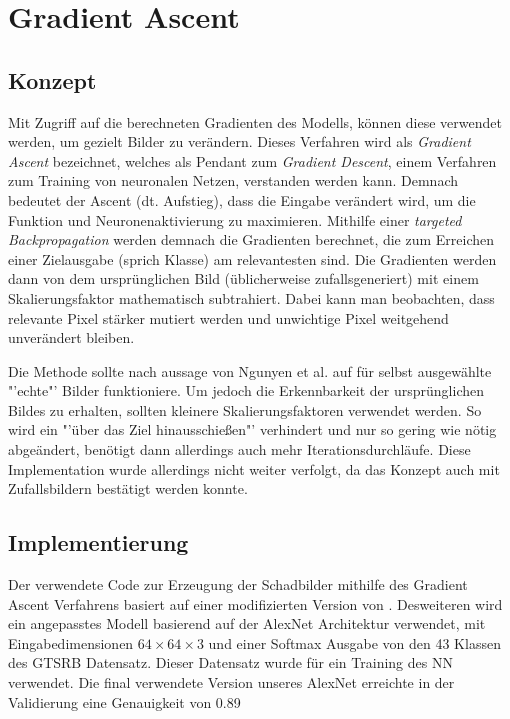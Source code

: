 \chapter{Gradient Ascent}
\label{cha:gascent}
\section{Konzept}

Mit Zugriff auf die berechneten Gradienten des Modells, können diese verwendet werden, um gezielt Bilder zu verändern. Dieses Verfahren wird als \textit{Gradient Ascent} bezeichnet, welches als Pendant zum \textit{Gradient Descent}, einem Verfahren zum Training von neuronalen Netzen, verstanden werden kann. Demnach bedeutet der Ascent (dt. Aufstieg), dass die Eingabe verändert wird, um die Funktion und Neuronenaktivierung zu maximieren. Mithilfe einer \textit{targeted Backpropagation} werden demnach die Gradienten berechnet, die zum Erreichen einer Zielausgabe (sprich Klasse) am relevantesten sind. Die Gradienten werden dann von dem ursprünglichen Bild (üblicherweise zufallsgeneriert) mit einem Skalierungsfaktor mathematisch subtrahiert. Dabei kann man beobachten, dass relevante Pixel stärker mutiert werden und unwichtige Pixel weitgehend unverändert bleiben.


Die Methode sollte nach aussage von Ngunyen et al. \cite{nguyen_deep_2015} auf für selbst ausgewählte "'echte"' Bilder funktioniere. Um jedoch die Erkennbarkeit der ursprünglichen Bildes zu erhalten, sollten kleinere Skalierungsfaktoren verwendet werden. So wird ein "'über das Ziel hinausschießen"' verhindert und nur so gering wie nötig abgeändert, benötigt dann allerdings auch mehr Iterationsdurchläufe.
Diese Implementation wurde allerdings nicht weiter verfolgt, da das Konzept auch mit Zufallsbildern bestätigt werden konnte.

\section{Implementierung}
Der verwendete Code zur Erzeugung der Schadbilder mithilfe des Gradient Ascent Verfahrens basiert auf einer modifizierten Version von \cite{ozbulak_pytorch_2019}. Desweiteren wird ein angepasstes Modell basierend auf der AlexNet Architektur verwendet, mit Eingabedimensionen $64\times64\times3$ und einer Softmax Ausgabe von den 43 Klassen des \ac{GTSRB} Datensatz. 
Dieser Datensatz wurde für ein Training des \ac{NN} verwendet. 
Die final verwendete Version unseres AlexNet erreichte in der Validierung eine Genauigkeit von 0.89


